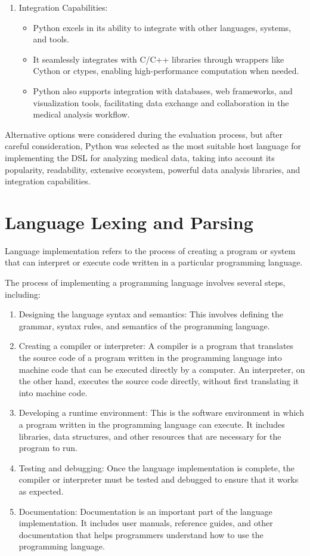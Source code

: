 \begin{enumerate}
  \item Integration Capabilities:
    \begin{itemize}
      \item Python excels in its ability to integrate with other languages, systems, and tools.
      \item It seamlessly integrates with C/C++ libraries through wrappers like Cython or ctypes, enabling high-performance computation when needed.
      \item Python also supports integration with databases, web frameworks, and visualization tools, facilitating data exchange and collaboration in the medical analysis workflow.
    \end{itemize}

\end{enumerate}

Alternative options were considered during the evaluation process, but after careful consideration, Python was selected as the most suitable host language for implementing the DSL for analyzing medical data, taking into account its popularity, readability, extensive ecosystem, powerful data analysis libraries, and integration capabilities.


\vspace{0.5cm}
\section{Language Lexing and Parsing}

Language implementation refers to the process of creating a program or system that can interpret or execute code written in a particular programming language.

The process of implementing a programming language involves several steps, including:

\begin{enumerate}
    \item Designing the language syntax and semantics: This involves defining the grammar, syntax rules, and semantics of the programming language.
    \item Creating a compiler or interpreter: A compiler is a program that translates the source code of a program written in the programming language into machine code that can be executed directly by a computer. An interpreter, on the other hand, executes the source code directly, without first translating it into machine code.
    \item Developing a runtime environment: This is the software environment in which a program written in the programming language can execute. It includes libraries, data structures, and other resources that are necessary for the program to run.
    \item Testing and debugging: Once the language implementation is complete, the compiler or interpreter must be tested and debugged to ensure that it works as expected.
    \item Documentation: Documentation is an important part of the language implementation. It includes user manuals, reference guides, and other documentation that helps programmers understand how to use the programming language.
\end{enumerate}

